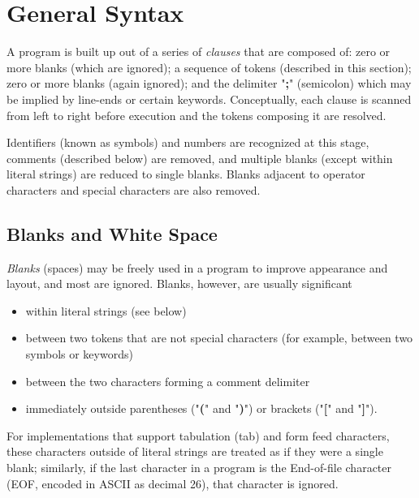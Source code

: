 \chapter{General Syntax}\label{refclau}
\index{,}
 A \crexx{} program is built up out of a series of \emph{clauses} that
are composed of: zero or more blanks (which are ignored); a sequence of
tokens (described in this section); zero or more blanks (again
ignored); and the delimiter "\textbf{;}" (semicolon) which may
be implied by line-ends or certain keywords.
Conceptually, each clause is scanned from left to right before
execution and the tokens composing it are resolved.
 
Identifiers (known as symbols) and numbers are recognized at this stage,
comments (described below) are removed, and multiple blanks (except
within literal strings) are reduced to single blanks.
Blanks adjacent to  operator characters %
and
 special characters %
 are also removed.
\section{Blanks and White Space}\label{refblank}
 \emph{Blanks} (spaces) may be freely used in a program to
improve appearance and layout, and most are ignored.
Blanks, however, are usually significant
\begin{itemize}
\item within literal strings (see below)
\item between two tokens that are not special characters (for example,
between two symbols or keywords)
\item between the two characters forming a comment delimiter
\item immediately outside parentheses ("\textbf{(}" and
"\textbf{)}") or brackets ("\textbf{[}" and
"\textbf{]}").
\end{itemize}
 
For implementations that support tabulation (tab) and form feed
characters, these characters outside of literal strings are treated as
if they were a single blank; similarly, if the last character in a
\crexx{} program is the End-of-file character (EOF, encoded in ASCII as
decimal 26), that character is ignored.
